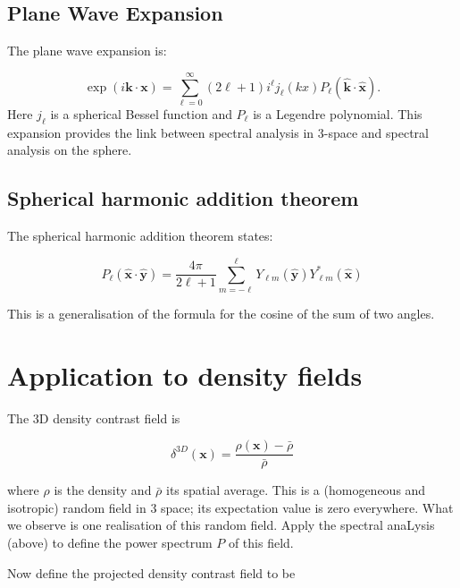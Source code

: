 \documentclass[11pt]{article}
\begin{document}
\subsection{Plane Wave Expansion}

The plane wave expansion is:

\begin{equation}
\exp(i \boldsymbol{k} \cdot \boldsymbol{x}) = \sum_{\ell=0}^\infty (2 \ell +1) i^{\ell} j_{\ell}(kx) P_{\ell}(\boldsymbol{\hat{k}} \cdot \boldsymbol{\hat{x}}).
\end{equation}
Here $j_{\ell}$ is a spherical Bessel function and $P_{\ell}$ is a Legendre polynomial. This expansion provides the link between spectral analysis in 3-space and spectral analysis on the sphere.

\subsection{Spherical harmonic addition theorem}

The spherical harmonic addition theorem states:

\begin{equation}
P_{\ell}(\boldsymbol{\hat{x}} \cdot \boldsymbol{\hat{y}}) = \frac{4 \pi}{2 \ell + 1}\sum_{m=-\ell}^{\ell} Y_{\ell m}(\boldsymbol{\hat{y}}) Y_{\ell m}^{\ast}(\boldsymbol{\hat{x}})
\end{equation}

\noindent This is a generalisation of the formula for the cosine of the sum of two angles.

\section{Application to density fields}

The 3D density contrast field is

\begin{equation}
\delta^{3D}(\boldsymbol{x}) = \frac{\rho(\boldsymbol{x}) - \bar{\rho}}{\bar{\rho}}
\end{equation}

\noindent where $\rho$ is the density and $\bar{\rho}$ its spatial average. This is a (homogeneous and isotropic) random field in 3 space; its expectation value is zero everywhere. What we observe is one realisation of this random field. Apply the spectral anaLysis (above) to define the power spectrum $P$ of this field.

Now define the projected density contrast field to be
\end{document}
